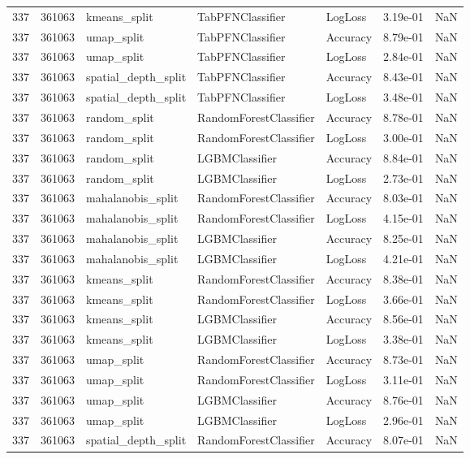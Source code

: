 \begin{tabular}{rrlllrr}
337 & 361063 & kmeans\_split & TabPFNClassifier & LogLoss & 3.19e-01 & NaN \\
337 & 361063 & umap\_split & TabPFNClassifier & Accuracy & 8.79e-01 & NaN \\
337 & 361063 & umap\_split & TabPFNClassifier & LogLoss & 2.84e-01 & NaN \\
337 & 361063 & spatial\_depth\_split & TabPFNClassifier & Accuracy & 8.43e-01 & NaN \\
337 & 361063 & spatial\_depth\_split & TabPFNClassifier & LogLoss & 3.48e-01 & NaN \\
337 & 361063 & random\_split & RandomForestClassifier & Accuracy & 8.78e-01 & NaN \\
337 & 361063 & random\_split & RandomForestClassifier & LogLoss & 3.00e-01 & NaN \\
337 & 361063 & random\_split & LGBMClassifier & Accuracy & 8.84e-01 & NaN \\
337 & 361063 & random\_split & LGBMClassifier & LogLoss & 2.73e-01 & NaN \\
337 & 361063 & mahalanobis\_split & RandomForestClassifier & Accuracy & 8.03e-01 & NaN \\
337 & 361063 & mahalanobis\_split & RandomForestClassifier & LogLoss & 4.15e-01 & NaN \\
337 & 361063 & mahalanobis\_split & LGBMClassifier & Accuracy & 8.25e-01 & NaN \\
337 & 361063 & mahalanobis\_split & LGBMClassifier & LogLoss & 4.21e-01 & NaN \\
337 & 361063 & kmeans\_split & RandomForestClassifier & Accuracy & 8.38e-01 & NaN \\
337 & 361063 & kmeans\_split & RandomForestClassifier & LogLoss & 3.66e-01 & NaN \\
337 & 361063 & kmeans\_split & LGBMClassifier & Accuracy & 8.56e-01 & NaN \\
337 & 361063 & kmeans\_split & LGBMClassifier & LogLoss & 3.38e-01 & NaN \\
337 & 361063 & umap\_split & RandomForestClassifier & Accuracy & 8.73e-01 & NaN \\
337 & 361063 & umap\_split & RandomForestClassifier & LogLoss & 3.11e-01 & NaN \\
337 & 361063 & umap\_split & LGBMClassifier & Accuracy & 8.76e-01 & NaN \\
337 & 361063 & umap\_split & LGBMClassifier & LogLoss & 2.96e-01 & NaN \\
337 & 361063 & spatial\_depth\_split & RandomForestClassifier & Accuracy & 8.07e-01 & NaN \\

\end{tabular}
